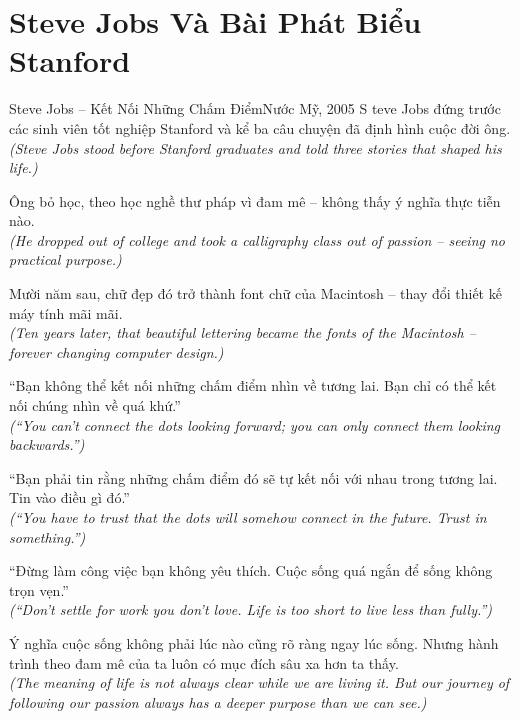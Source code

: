 \section{Steve Jobs Và Bài Phát Biểu Stanford}
\begin{truyen}{Steve Jobs -- Kết Nối Những Chấm Điểm}{Nước Mỹ, 2005}
S teve Jobs đứng trước các sinh viên tốt nghiệp Stanford và kể ba câu chuyện đã định hình cuộc đời ông.\\
\textit{(Steve Jobs stood before Stanford graduates and told three stories that shaped his life.)}

Ông bỏ học, theo học nghề thư pháp vì đam mê -- không thấy ý nghĩa thực tiễn nào.\\
\textit{(He dropped out of college and took a calligraphy class out of passion -- seeing no practical purpose.)}

Mười năm sau, chữ đẹp đó trở thành font chữ của Macintosh -- thay đổi thiết kế máy tính mãi mãi.\\
\textit{(Ten years later, that beautiful lettering became the fonts of the Macintosh -- forever changing computer design.)}

``Bạn không thể kết nối những chấm điểm nhìn về tương lai. Bạn chỉ có thể kết nối chúng nhìn về quá khứ.''\\
\textit{(``You can't connect the dots looking forward; you can only connect them looking backwards.'')}

``Bạn phải tin rằng những chấm điểm đó sẽ tự kết nối với nhau trong tương lai. Tin vào điều gì đó.''\\
\textit{(``You have to trust that the dots will somehow connect in the future. Trust in something.'')}

``Đừng làm công việc bạn không yêu thích. Cuộc sống quá ngắn để sống không trọn vẹn.''\\
\textit{(``Don't settle for work you don't love. Life is too short to live less than fully.'')}

\end{truyen}
\begin{baihoc}
  Ý nghĩa cuộc sống không phải lúc nào cũng rõ ràng ngay lúc sống. Nhưng hành trình theo đam mê của ta luôn có mục đích sâu xa hơn ta thấy.\\
  \textit{(The meaning of life is not always clear while we are living it. But our journey of following our passion always has a deeper purpose than we can see.)}
\end{baihoc}


